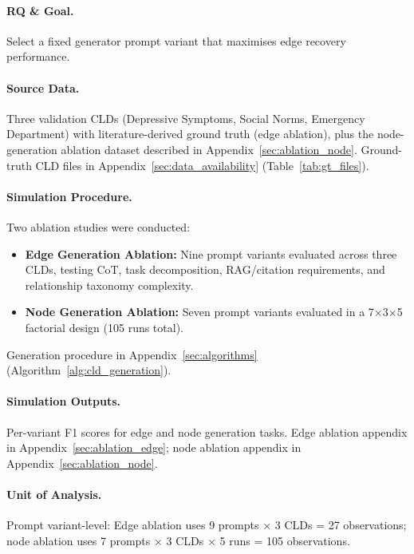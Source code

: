 \paragraph{RQ \& Goal.}
Select a fixed generator prompt variant that maximises edge recovery performance.

\paragraph{Source Data.}
Three validation CLDs (Depressive Symptoms, Social Norms, Emergency Department) with literature-derived ground truth (edge ablation), plus the node-generation ablation dataset described in Appendix~\ref{sec:ablation_node}.
Ground-truth CLD files in Appendix~\ref{sec:data_availability} (Table~\ref{tab:gt_files}).

\paragraph{Simulation Procedure.}
Two ablation studies were conducted:
\begin{itemize}[noitemsep]
    \item \textbf{Edge Generation Ablation:} Nine prompt variants evaluated across three CLDs, testing CoT, task decomposition, RAG/citation requirements, and relationship taxonomy complexity.
    \item \textbf{Node Generation Ablation:} Seven prompt variants evaluated in a 7$\times$3$\times$5 factorial design (105 runs total).
\end{itemize}
Generation procedure in Appendix~\ref{sec:algorithms} (Algorithm~\ref{alg:cld_generation}).

\paragraph{Simulation Outputs.}
Per-variant F1 scores for edge and node generation tasks.
Edge ablation appendix in Appendix~\ref{sec:ablation_edge}; node ablation appendix in Appendix~\ref{sec:ablation_node}.

\paragraph{Unit of Analysis.}
Prompt variant-level: Edge ablation uses 9 prompts $\times$ 3 CLDs = 27 observations; node ablation uses 7 prompts $\times$ 3 CLDs $\times$ 5 runs = 105 observations.

